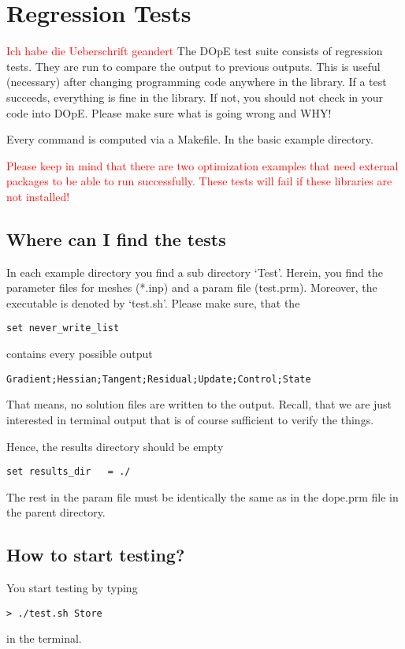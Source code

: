 \chapter{Regression Tests}\label{chap:test}
\textcolor{red}{Ich habe die Ueberschrift geandert}
The DOpE test suite consists of regression tests. They are run to compare 
the output to previous outputs. This is useful (necessary) after 
changing programming code anywhere in the library. If a test
succeeds, everything is fine in the library. If not, you should not
check in your code into DOpE. Please make sure what is going wrong and WHY!

Every command is computed via a Makefile. In the basic example 
directory.

\textcolor{red}{
\begin{remark}
Please keep in mind that there are two optimization examples that 
need external packages to be able to run successfully. These tests will
fail if these libraries are not installed!
\end{remark}
}

\section{Where can I find the tests}
In each example directory you find a sub directory `Test'. Herein, you find 
the parameter files for meshes (*.inp) and a param file (test.prm).
Moreover, the executable is denoted by `test.sh'. Please make sure, that 
the 
\begin{verbatim}
set never_write_list
\end{verbatim}
contains every possible output
\begin{verbatim}
Gradient;Hessian;Tangent;Residual;Update;Control;State
\end{verbatim}
That means, no solution files are written to the output.
Recall, that we are just interested in terminal output that 
is of course sufficient to verify the things.

Hence, the results directory should be empty
\begin{verbatim}
set results_dir   = ./
\end{verbatim}
The rest in the param file must be identically the same as 
in the dope.prm file in the parent directory. 

\section{How to start testing?}
You start testing by typing 
\begin{verbatim}
> ./test.sh Store
\end{verbatim}
in the terminal.

